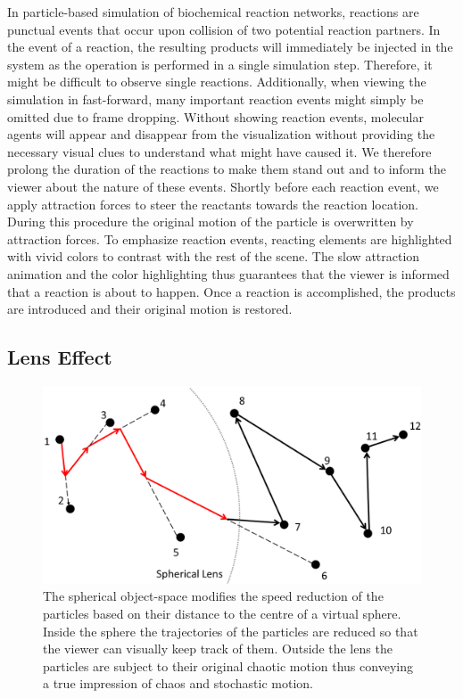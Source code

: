 In particle-based simulation of biochemical reaction networks, reactions are punctual events that occur upon collision of two potential reaction partners.
In the event of a reaction, the resulting products will immediately be injected in the system as the operation is performed in a single simulation step.
Therefore, it might be difficult to observe single reactions.
Additionally, when viewing the simulation in fast-forward, many important reaction events might simply be omitted due to frame dropping.
Without showing reaction events, molecular agents will appear and disappear from the visualization without providing the necessary visual clues to understand what might have caused it.
We therefore prolong the duration of the reactions to make them stand out and to inform the viewer about the nature of these events.
Shortly before each reaction event, we apply attraction forces to steer the reactants towards the reaction location. 
During this procedure the original motion of the particle is overwritten by attraction forces.
To emphasize reaction events, reacting elements are highlighted with vivid colors to contrast with the rest of the scene.
The slow attraction animation and the color highlighting thus guarantees that the viewer is informed that a reaction is about to happen.
Once a reaction is accomplished, the products are introduced and their original motion is restored.



\subsection{Lens Effect}

\begin{figure}
\centering
\includegraphics[width=0.5\linewidth]{graphics/SphericalLens}
\caption{The spherical object-space modifies the speed reduction of the particles based on their distance to the centre of a virtual sphere. Inside the sphere the trajectories of the particles are reduced so that the viewer can visually keep track of them. Outside the lens the particles are subject to their original chaotic motion thus conveying a true impression of chaos and stochastic motion.}
\label{fig:sphericallens}
\end{figure}

